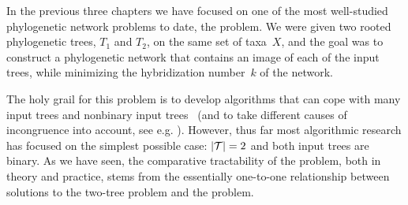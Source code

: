 
In the previous three chapters we have focused on one of the most well-studied phylogenetic network problems to date, the \mh problem. We were given two rooted phylogenetic trees, $T_1$ and $T_2$, on the same set of taxa~$X$, and the goal was to construct a phylogenetic network that contains an image of each of the input trees, while minimizing the hybridization number~$k$ of the network. 


The holy grail for this problem is to develop algorithms that can cope with many input trees and nonbinary input trees~\cite{davidbook} (and to take different causes of incongruence into account, see e.g. \cite{yu2013parsimonious}).  However, thus far most algorithmic research has focused on the simplest possible case: $|{\mathcal T}|=2$ and both input trees are binary. As we have seen, the comparative tractability of the problem, both in theory and practice, stems from the essentially one-to-one relationship between solutions to the two-tree problem and the \maaf problem. 



